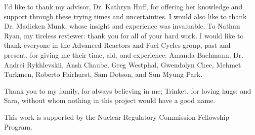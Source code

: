 I'd like to thank my advisor, Dr. Kathryn Huff, for offering her knowledge and support through these trying times and uncertainties.  I would also like to thank Dr. Madicken Munk, whose insight and experience was invaluable.  To Nathan Ryan, my tireless reviewer: thank you for all of your hard work.  I would like to thank everyone in the Advanced Reactors and Fuel Cycles group, past and present, for giving me their time, aid, and experience: Amanda Bachmann, Dr. Andrei Rykhlevskii, Ansh Chaube, Greg Westphal, Gwendolyn Chee, Mehmet Turkmen, Roberto Fairhurst, Sam Dotson, and Sun Myung Park.  

Thank you to my family, for always believing in me; Trinket, for loving hugs; and Sara, without whom nothing in this project would have a good name.


This work is supported by the Nuclear Regulatory Commission Fellowship Program.